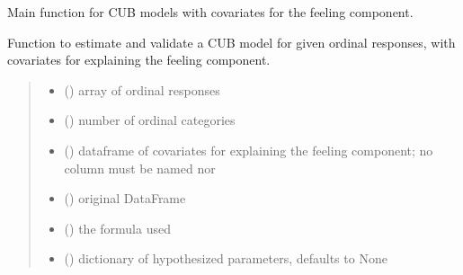 \documentclass[letterpaper,10pt,english]{sphinxmanual}
\begin{document}

\begin{fulllineitems}
\label{\detokenize{cubmods:cubmods.cub_0w.mle}}
\pysigstartsignatures
{}
\pysigstopsignatures
\sphinxAtStartPar
Main function for CUB models with covariates for the feeling component.

\sphinxAtStartPar
Function to estimate and validate a CUB model for given ordinal responses, with covariates for
explaining the feeling component.
\begin{quote}\begin{description}
\begin{itemize}
\item {} 
\sphinxAtStartPar
{} () \textendash{} array of ordinal responses

\item {} 
\sphinxAtStartPar
{} () \textendash{} number of ordinal categories

\item {} 
\sphinxAtStartPar
{} () \textendash{} dataframe of covariates for explaining the feeling component;
no column must be named  nor 

\item {} 
\sphinxAtStartPar
{} () \textendash{} original DataFrame

\item {} 
\sphinxAtStartPar
{} () \textendash{} the formula used

\item {} 
\sphinxAtStartPar
{} (\sphinxstyleliteralemphasis{\sphinxupquote{, }}) \textendash{} dictionary of hypothesized parameters, defaults to None


\end{itemize}
\end{description}
\end{quote}
\end{fulllineitems}
\end{document}
